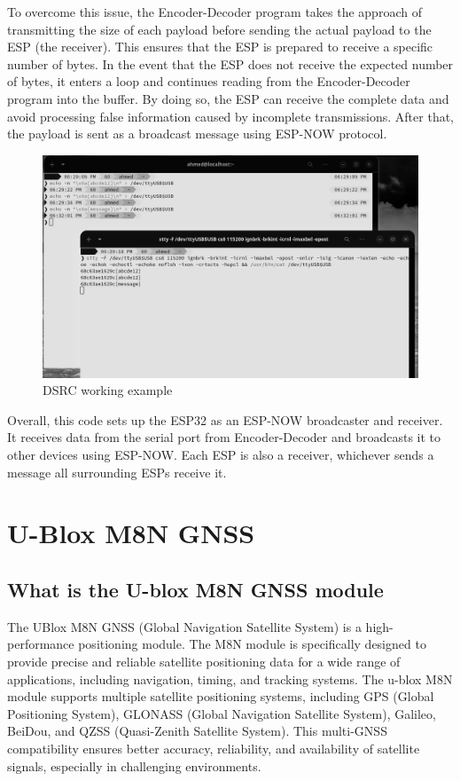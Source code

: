 \documentclass[
12pt,
oneside, 
onehalfspacing, 
nolistspacing, 
parskip, 
chapterinoneline, 
]{AASTCOMPUTER}
\begin{document}
To overcome this issue, the Encoder-Decoder program takes the approach of transmitting the size of each payload before sending the actual payload to the ESP (the receiver). This ensures that the ESP is prepared to receive a specific number of bytes. In the event that the ESP does not receive the expected number of bytes, it enters a loop and continues reading from the Encoder-Decoder program into the buffer. By doing so, the ESP can receive the complete data and avoid processing false information caused by incomplete transmissions.
After that, the payload is sent as a broadcast message using ESP-NOW protocol.
\begin{figure}[!ht]
\centering
\includegraphics[scale=0.3]{Figures/10.png}
\caption[DSRC working example]{DSRC working example}
\label{fig:TCU}
\end{figure}
Overall, this code sets up the ESP32 as an ESP-NOW broadcaster and receiver. It receives data from the serial port from Encoder-Decoder and broadcasts it to other devices using ESP-NOW. Each ESP is also a receiver, whichever sends a message all surrounding ESPs receive it.

\section{U-Blox M8N GNSS}
\subsection{What is the U-blox M8N GNSS module}
The UBlox M8N GNSS (Global Navigation Satellite System) is a high-performance positioning module. The M8N module is specifically designed to provide precise and reliable satellite positioning data for a wide range of applications, including navigation, timing, and tracking systems. The u-blox M8N module supports multiple satellite positioning systems, including GPS (Global Positioning System), GLONASS (Global Navigation Satellite System), Galileo, BeiDou, and QZSS (Quasi-Zenith Satellite System). This multi-GNSS compatibility ensures better accuracy, reliability, and availability of satellite signals, especially in challenging environments.
\end{document}
